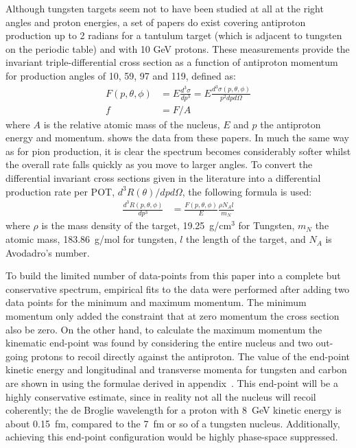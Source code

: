 Although tungsten targets seem not to have been studied at all at the right angles and proton energies, a set of papers \cite{Boyarinov:1994tp,Kiselev:2012sj} do exist covering antiproton production up to 2 radians for a tantulum target (which is adjacent to tungsten on the periodic table) and with 10 GeV protons.
These measurements provide the invariant triple-differential cross section as a function of antiproton momentum for production angles of 10, 59, 97 and 119\degree, defined as:
\begin{align}
	F(p,\theta,\phi)&=E \frac{d^3\sigma}{dp^3}=E\frac{d^3\sigma(p,\theta,\phi)}{p^2dpd\Omega} \\
	f&=F/A
\end{align}
where $A$ is the relative atomic mass of the nucleus, $E$ and $p$ the antiproton energy and momentum.
 shows the data from these papers.
In much the same way as for pion production, it is clear the spectrum becomes considerably softer whilst the overall rate falls quickly as you move to larger angles.
To convert the differential invariant cross sections given in the literature into a differential production rate per \ac{POT}, $d^3R(\theta)/dpd\Omega$, the following formula is used:
\begin{align}
	\frac{d^3R(p,\theta,\phi)}{dp^3}&=\frac{F(p,\theta,\phi)}{E}\frac{\rho N_A l}{m_N}
\end{align}
where $\rho$ is the mass density of the target, 19.25~g/cm$^3$ for Tungsten, $m_N$ the atomic mass, 183.86~g/mol for tungsten, $l$ the length of the target, and $N_A$ is Avodadro's number.

\FigAntiprotonEndpoint
To build the limited number of data-points from this paper into a complete but conservative spectrum, empirical fits to the data were performed after adding two data points for the minimum and maximum momentum.
The minimum momentum only added the constraint that at zero momentum the cross section also be zero.
On the other hand, to calculate the maximum momentum the kinematic end-point was found by considering the entire nucleus and two out-going protons to recoil directly against the antiproton.
The value of the end-point kinetic energy and longitudinal and transverse momenta for tungsten and carbon are shown in  using the formulae derived in appendix~.
This end-point will be a highly conservative estimate, since in reality not all the nucleus will recoil coherently;  the de Broglie wavelength for a proton with 8~GeV kinetic energy is about 0.15~fm, compared to the 7~fm or so of a tungsten nucleus.
Additionally, achieving this end-point configuration would be highly phase-space suppressed.

